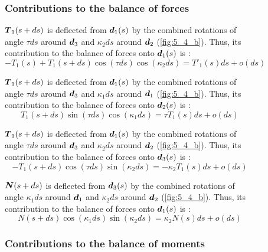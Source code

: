 \begin{figure}[p]
	\begin{fullpage}
	\subsubsection{Contributions to the balance of forces}
	\vspace{10pt}
	
	$\boldsymbol{T}_1(s+ds)$ is deflected from $\boldsymbol{d}_1(s)$ by the combined rotations of angle $\tau ds$ around $\boldsymbol{d}_3$ and $\kappa_2 ds$ around $\boldsymbol{d}_2$ (\cref{fig:5_4_b}). Thus, its contribution to the balance of forces onto $\boldsymbol{d}_1(s)$ is : 
	\begin{equation*}
		-T_1(s) + T_1(s+ds) \cos(\tau ds) \cos(\kappa_2 ds) = T'_1 (s) ds + o(ds)
	\end{equation*}
	
	$\boldsymbol{T}_1(s+ds)$ is deflected from $\boldsymbol{d}_1(s)$ by the combined rotations of angle $\tau ds$ around $\boldsymbol{d}_3$ and $\kappa_1 ds$ around $\boldsymbol{d}_1$ (\cref{fig:5_4_b}). Thus, its contribution to the balance of forces onto $\boldsymbol{d}_2(s)$ is : 
	\begin{equation*}
		T_1(s+ds) \sin(\tau ds) \cos(\kappa_1 ds) = \tau T_1 (s) ds + o(ds)
	\end{equation*}	
	
	$\boldsymbol{T}_1(s+ds)$ is deflected from $\boldsymbol{d}_1(s)$ by the combined rotations of angle $\tau ds$ around $\boldsymbol{d}_3$ and $\kappa_2 ds$ around $\boldsymbol{d}_2$ (\cref{fig:5_4_b}). Thus, its contribution to the balance of forces onto $\boldsymbol{d}_3(s)$ is : 
	\begin{equation*}
		-T_1(s+ds) \cos(\tau ds) \sin(\kappa_2 ds) = - \kappa_2 T_1(s) ds + o(ds)
	\end{equation*}	
	
	$\boldsymbol{N}(s+ds)$ is deflected from $\boldsymbol{d}_3(s)$ by the combined rotations of angle $\kappa_1 ds$ around $\boldsymbol{d}_1$ and $\kappa_2 ds$ around $\boldsymbol{d}_2$ (\cref{fig:5_4_b}). Thus, its contribution to the balance of forces onto $\boldsymbol{d}_1(s)$ is : 
	\begin{equation*}
		N(s+ds) \cos(\kappa_1 ds) \sin(\kappa_2 ds) = \kappa_2 N(s) ds + o(ds)
	\end{equation*}
	\vspace{10pt}

	\subsubsection{Contributions to the balance of moments}
	\vspace{10pt}
	

\end{fullpage}
\end{figure}
